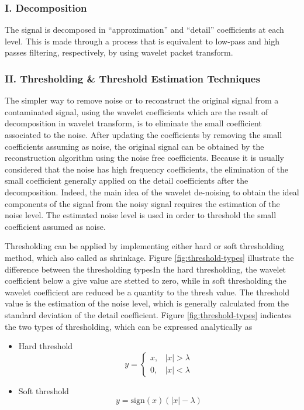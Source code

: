\documentclass[12pt, a4paper, twoside]{report}
\begin{document}
\subsubsection{I. Decomposition}
The signal is decomposed in ``approximation'' and ``detail'' coefficients at each level. This is made through a process that is equivalent to low-pass and high passes filtering, respectively, by using wavelet packet transform.

\subsubsection{II. Thresholding \& Threshold Estimation Techniques}
The simpler way to remove noise or to reconstruct the original signal from a contaminated signal, using the wavelet coefficients which are the result of decomposition in wavelet transform, is to eliminate the small coefficient associated to the noise. After updating the coefficients by removing the small coefficients assuming as noise, the original signal can be obtained by the reconstruction algorithm using the noise free coefficients. Because it is usually considered that the noise has high frequency coefficients, the elimination of the small coefficient generally applied on the detail coefficients after the decomposition. Indeed, the main idea of the wavelet de-noising to obtain the ideal components of the signal from the noisy signal requires the estimation of the noise level. The estimated noise level is used in order to threshold the small coefficient assumed as noise.

Thresholding can be applied by implementing either hard or soft thresholding method, which also called as shrinkage. Figure  \ref{fig:threshold-types} illustrate the difference between the thresholding typesIn the hard thresholding, the wavelet coefficient below a give value are stetted to zero, while in soft thresholding the wavelet coefficient are reduced be a quantity to the thresh value.  The threshold value is the estimation of the noise level, which is generally calculated from the standard deviation of the detail coefficient. Figure \ref{fig:threshold-types} indicates the two types of thresholding, which can be expressed analytically as
\begin{itemize}
\item Hard threshold
\begin{equation}
y = \begin{cases}
x, & \left | x  \right | > \lambda \\ 
0, & \left | x  \right | < \lambda
\end{cases}
\end{equation}
\item Soft threshold
\begin{equation}
y = \text{sign}(x) \left ( \left | x \right | - \lambda \right )
\end{equation}
\end{itemize}
\end{document}
